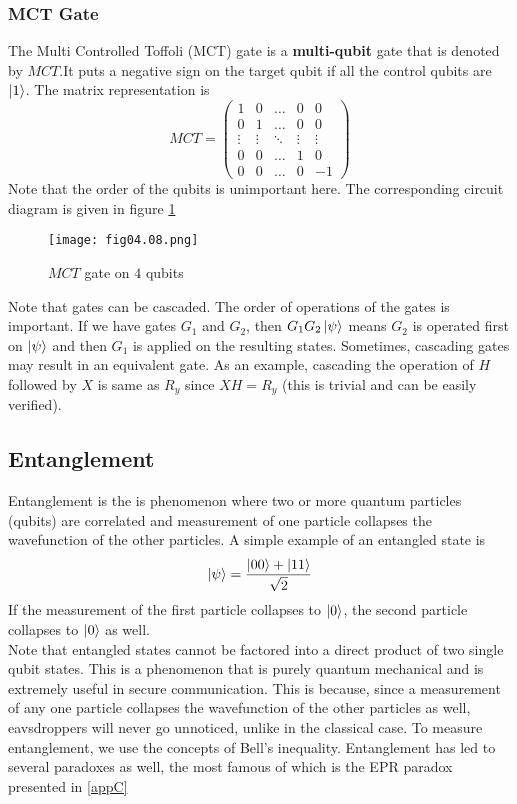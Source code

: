 \subsubsection*{MCT Gate}
The Multi Controlled Toffoli (MCT) gate is a \textbf{multi-qubit} gate that is denoted by $MCT$.It puts a negative sign on the target qubit if all the control qubits are $\left\vert 1\right\rangle$.
The matrix representation is
\begin{equation*}
MCT=
\begin{pmatrix}
1&0&\dots&0&0\\
0&1&\dots&0&0\\
\vdots&\vdots&\ddots&\vdots&\vdots\\
0&0&\dots&1&0\\
0&0&\dots&0&-1
\end{pmatrix}
\end{equation*}
Note that the order of the qubits is unimportant here. The corresponding circuit diagram is given in figure \ref{Fig:4.8}
\begin{figure}[!htb]
   \begin{minipage}{\textwidth}
     \centering
     \texttt{[image: fig04.08.png]}
     \caption{$MCT$ gate on $4$ qubits}
     \label{Fig:4.8}
   \end{minipage}
\end{figure}


Note that gates can be cascaded. The order of operations of the gates is important. If we have gates $G_1$ and $G_2$, then $G_1G_2\left\vert \psi\right\rangle$ means $G_2$ is operated first on $\left\vert \psi\right\rangle$ and then $G_1$ is applied on the resulting states. Sometimes, cascading gates may result in an equivalent gate. As an example, cascading the operation of $H$ followed by $X$ is same as $R_y$ since $XH=R_y$ (this is trivial and can be easily verified). 

\subsection{Entanglement}
Entanglement is the is phenomenon where two or more quantum particles (qubits) are correlated and measurement of one particle collapses the wavefunction of the other particles. A simple example of an entangled state is
\begin{equation*}
\left\vert \psi\right\rangle=\frac{\displaystyle \left\vert 00\right\rangle+\left\vert 11\right\rangle}{\displaystyle \sqrt{2}}
\end{equation*}
If the measurement of the first particle collapses to $\left\vert 0\right\rangle$, the second particle collapses to $\left\vert 0\right\rangle$ as well.\\
Note that entangled states cannot be factored into a direct product of two single qubit states. This is a phenomenon that is purely quantum mechanical and is extremely useful in secure communication. This is because, since a measurement of any one particle collapses the wavefunction of the other particles as well, eavsdroppers will never go unnoticed, unlike in the classical case. To measure entanglement, we use the concepts of Bell's inequality. Entanglement has led to several paradoxes as well, the most famous of which is the EPR paradox presented in \ref{appC}